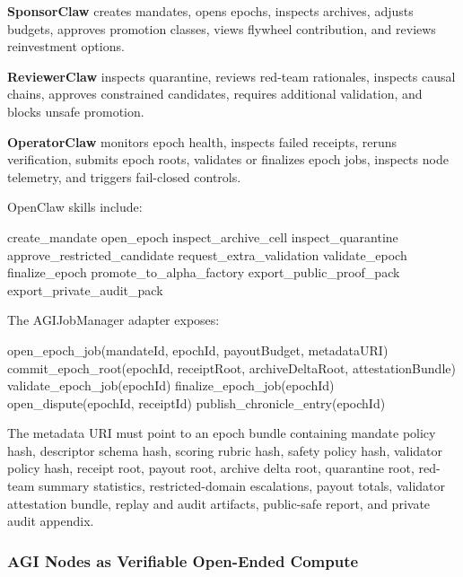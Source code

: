 \documentclass[
  11pt,
]{article}
\newenvironment{Shaded}{}{}
\newcommand{\NormalTok}[1]{#1}
\begin{document}
\textbf{SponsorClaw} creates mandates, opens epochs, inspects archives,
adjusts budgets, approves promotion classes, views flywheel
contribution, and reviews reinvestment options.

\textbf{ReviewerClaw} inspects quarantine, reviews red-team rationales,
inspects causal chains, approves constrained candidates, requires
additional validation, and blocks unsafe promotion.

\textbf{OperatorClaw} monitors epoch health, inspects failed receipts,
reruns verification, submits epoch roots, validates or finalizes epoch
jobs, inspects node telemetry, and triggers fail-closed controls.

OpenClaw skills include:

\begin{Shaded}
\begin{Highlighting}[]
\NormalTok{create\_mandate}
\NormalTok{open\_epoch}
\NormalTok{inspect\_archive\_cell}
\NormalTok{inspect\_quarantine}
\NormalTok{approve\_restricted\_candidate}
\NormalTok{request\_extra\_validation}
\NormalTok{validate\_epoch}
\NormalTok{finalize\_epoch}
\NormalTok{promote\_to\_alpha\_factory}
\NormalTok{export\_public\_proof\_pack}
\NormalTok{export\_private\_audit\_pack}
\end{Highlighting}
\end{Shaded}

The AGIJobManager adapter exposes:

\begin{Shaded}
\begin{Highlighting}[]
\NormalTok{open\_epoch\_job(mandateId, epochId, payoutBudget, metadataURI)}
\NormalTok{commit\_epoch\_root(epochId, receiptRoot, archiveDeltaRoot, attestationBundle)}
\NormalTok{validate\_epoch\_job(epochId)}
\NormalTok{finalize\_epoch\_job(epochId)}
\NormalTok{open\_dispute(epochId, receiptId)}
\NormalTok{publish\_chronicle\_entry(epochId)}
\end{Highlighting}
\end{Shaded}

The metadata URI must point to an epoch bundle containing mandate policy
hash, descriptor schema hash, scoring rubric hash, safety policy hash,
validator policy hash, receipt root, payout root, archive delta root,
quarantine root, red-team summary statistics, restricted-domain
escalations, payout totals, validator attestation bundle, replay and
audit artifacts, public-safe report, and private audit appendix.

\subsubsection{AGI Nodes as Verifiable Open-Ended
Compute}\label{agi-nodes-as-verifiable-open-ended-compute}
\end{document}
